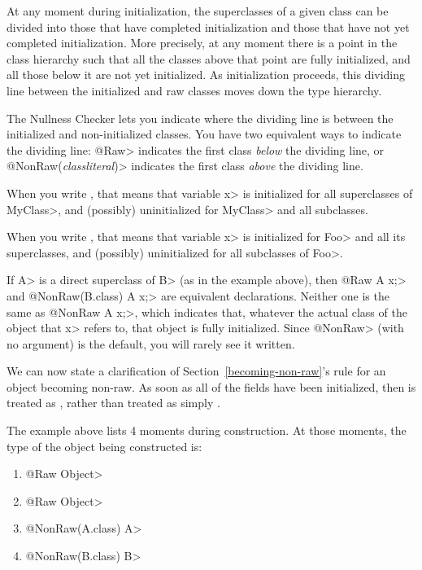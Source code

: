 At any moment during initialization, the superclasses of a given class
can be divided into those that have completed initialization and those that
have not yet completed initialization.  More precisely, at any moment there
is a point in the class hierarchy such that all the classes above that
point are fully initialized, and all those below it are not yet
initialized.  As initialization proceeds, this dividing line between the
initialized and raw classes moves down the type hierarchy.

The Nullness Checker lets you indicate where the dividing line is between
the initialized and non-initialized classes.
You have two equivalent ways to indicate the dividing line:  \<@Raw>
indicates the first class \emph{below} the dividing line, or
\<@NonRaw(\emph{classliteral})> indicates the first class \emph{above} the
dividing line.

When you write , that
means that variable \<x> is initialized for all superclasses of \<MyClass>,
and (possibly) uninitialized for \<MyClass> and all subclasses.

When you write , that means that variable \<x> is initialized for \<Foo> and all its
superclasses, and (possibly) uninitialized for all subclasses of \<Foo>.

If \<A> is a direct superclass of \<B> (as in the example above), then
\<@Raw A x;> and \<@NonRaw(B.class) A x;> are equivalent declarations.
Neither one is the same as \<@NonRaw A x;>, which indicates that, whatever
the actual class of the object that \<x> refers to, that object is fully
initialized.  Since \<@NonRaw> (with no argument) is the default, you will
rarely see it written.

\label{becoming-non-raw-clarification}

We can now state a clarification of Section~\ref{becoming-non-raw}'s rule
for an object becoming non-raw.
As soon as all of the  fields
have been initialized, then  is treated as
, rather than
treated as simply
.

The example above lists 4 moments during construction.  At those moments,
the type of the object being constructed is:

\begin{enumerate}
\item
  \<@Raw Object>
\item
  \<@Raw Object>
\item
  \<@NonRaw(A.class) A>
\item
  \<@NonRaw(B.class) B>
\end{enumerate}

